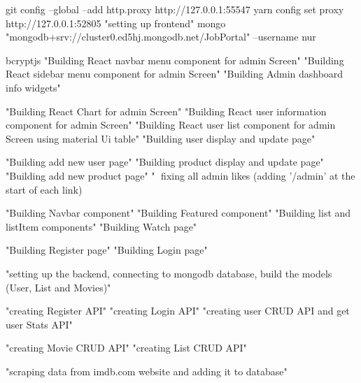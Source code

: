 git config --global --add http.proxy http://127.0.0.1:55547
yarn config set proxy http://127.0.0.1:52805
"setting up frontend"
mongo "mongodb+srv://cluster0.ed5hj.mongodb.net/JobPortal" --username nur

bcryptjs
"Building React navbar menu component for admin Screen"
"Building React sidebar menu component for admin Screen"
"Building Admin dashboard info widgets"

"Building React Chart for admin Screen"
"Building React user information component for admin Screen"
"Building React user list component for admin Screen using material Ui table"
"Building user display and update page"

"Building add new user page"
"Building product display and update page"
"Building add new product page"
"🔨 fixing all admin likes (adding '/admin' at the start of each link)

"Building Navbar component"
"Building Featured component"
"Building list and listItem components"
"Building Watch page"

"Building Register page"
"Building Login page"

"setting up the backend, connecting to mongodb database, build the models (User, List and Movies)"

"creating Register API"
"creating Login API"
"creating user CRUD API and get user Stats API"

"creating Movie CRUD API"
"creating List CRUD API"

"scraping data from imdb.com website and adding it to database"